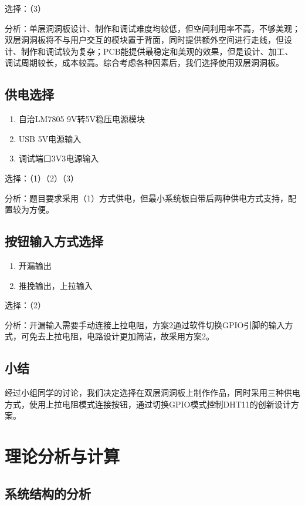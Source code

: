 \documentclass[a4paper,11pt,UTF8]{ctexart}
\begin{document}
选择：（3）

分析：单层洞洞板设计、制作和调试难度均较低，但空间利用率不高，不够美观；双层洞洞板将不与用户交互的模块置于背面，同时提供额外空间进行走线，但设计、制作和调试较为复杂；PCB能提供最稳定和美观的效果，但是设计、加工、调试周期较长，成本较高。综合考虑各种因素后，我们选择使用双层洞洞板。

\subsection{供电选择}

\begin{enumerate}
    \item 自治LM7805 9V转5V稳压电源模块
    \item USB 5V电源输入
    \item 调试端口3V3电源输入
\end{enumerate}

选择：（1）（2）（3）

分析：题目要求采用（1）方式供电，但最小系统板自带后两种供电方式支持，配置较为方便。

\subsection{按钮输入方式选择}

\begin{enumerate}
    \item 开漏输出
    \item 推挽输出，上拉输入
\end{enumerate}

选择：（2）

分析：开漏输入需要手动连接上拉电阻，方案2通过软件切换GPIO引脚的输入方式，可免去上拉电阻，电路设计更加简洁，故采用方案2。

\subsection{小结}

经过小组同学的讨论，我们决定选择在双层洞洞板上制作作品，同时采用三种供电方式，使用上拉电阻模式连接按钮，通过切换GPIO模式控制DHT11的创新设计方案。

\section{理论分析与计算}

\subsection{系统结构的分析}
\end{document}
